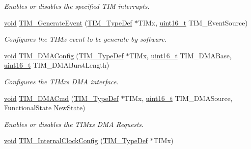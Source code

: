 \begin{DoxyCompactItemize}
\begin{DoxyCompactList}\small\item\em Enables or disables the specified T\+IM interrupts. \end{DoxyCompactList}\item 
\hyperlink{usb__devapi_8h_afabf60e7f57651d6d595a02c75f07cd0}{void} \hyperlink{group___t_i_m___private___functions_ga38bd4ffda920dd4f7655a0a2c6100a6e}{T\+I\+M\+\_\+\+Generate\+Event} (\hyperlink{struct_t_i_m___type_def}{T\+I\+M\+\_\+\+Type\+Def} $\ast$T\+I\+Mx, \hyperlink{_p_e___types_8h_a1f1825b69244eb3ad2c7165ddc99c956}{uint16\+\_\+t} T\+I\+M\+\_\+\+Event\+Source)
\begin{DoxyCompactList}\small\item\em Configures the T\+I\+Mx event to be generate by software. \end{DoxyCompactList}\item 
\hyperlink{usb__devapi_8h_afabf60e7f57651d6d595a02c75f07cd0}{void} \hyperlink{group___t_i_m___private___functions_gad7156f84c436c8ac92cd789611826d09}{T\+I\+M\+\_\+\+D\+M\+A\+Config} (\hyperlink{struct_t_i_m___type_def}{T\+I\+M\+\_\+\+Type\+Def} $\ast$T\+I\+Mx, \hyperlink{_p_e___types_8h_a1f1825b69244eb3ad2c7165ddc99c956}{uint16\+\_\+t} T\+I\+M\+\_\+\+D\+M\+A\+Base, \hyperlink{_p_e___types_8h_a1f1825b69244eb3ad2c7165ddc99c956}{uint16\+\_\+t} T\+I\+M\+\_\+\+D\+M\+A\+Burst\+Length)
\begin{DoxyCompactList}\small\item\em Configures the T\+I\+Mx\textquotesingle{}s D\+MA interface. \end{DoxyCompactList}\item 
\hyperlink{usb__devapi_8h_afabf60e7f57651d6d595a02c75f07cd0}{void} \hyperlink{group___t_i_m___private___functions_ga24700389cfa3ea9b42234933b23f1399}{T\+I\+M\+\_\+\+D\+M\+A\+Cmd} (\hyperlink{struct_t_i_m___type_def}{T\+I\+M\+\_\+\+Type\+Def} $\ast$T\+I\+Mx, \hyperlink{_p_e___types_8h_a1f1825b69244eb3ad2c7165ddc99c956}{uint16\+\_\+t} T\+I\+M\+\_\+\+D\+M\+A\+Source, \hyperlink{agilefox_2library_2inc_2stm32f10x__type_8h_ac9a7e9a35d2513ec15c3b537aaa4fba1}{Functional\+State} New\+State)
\begin{DoxyCompactList}\small\item\em Enables or disables the T\+I\+Mx\textquotesingle{}s D\+MA Requests. \end{DoxyCompactList}\item 
\hyperlink{usb__devapi_8h_afabf60e7f57651d6d595a02c75f07cd0}{void} \hyperlink{group___t_i_m___private___functions_ga2394f0221709c0659874f9a4184cf86e}{T\+I\+M\+\_\+\+Internal\+Clock\+Config} (\hyperlink{struct_t_i_m___type_def}{T\+I\+M\+\_\+\+Type\+Def} $\ast$T\+I\+Mx)

\end{DoxyCompactItemize}
